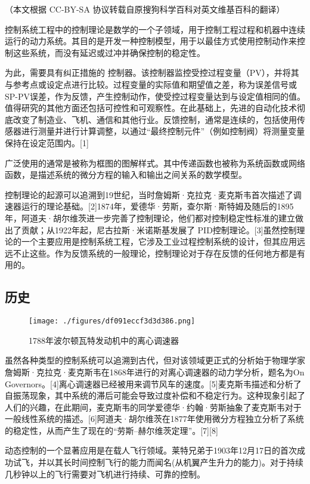 
（本文根据 CC-BY-SA 协议转载自原搜狗科学百科对英文维基百科的翻译）

控制系统工程中的控制理论是数学的一个子领域，用于控制工程过程和机器中连续运行的动力系统。其目的是开发一种控制模型，用于以最佳方式使用控制动作来控制这些系统，而没有延迟或过冲并确保控制的稳定性。

为此，需要具有纠正措施的 控制器。该控制器监控受控过程变量（PV），并将其与参考点或设定点进行比较。过程变量的实际值和期望值之差，称为误差信号或SP-PV误差，作为反馈，产生控制动作，使受控过程变量达到与设定值相同的值。值得研究的其他方面还包括可控性和可观察性。在此基础上，先进的自动化技术彻底改变了制造业、飞机、通信和其他行业。反馈控制，通常是连续的，包括使用传感器进行测量并进行计算调整，以通过“最终控制元件”（例如控制阀）将测量变量保持在设定范围内。[1]

广泛使用的通常是被称为框图的图解样式。其中传递函数也被称为系统函数或网络函数，是描述系统的微分方程的输入和输出之间关系的数学模型。

控制理论的起源可以追溯到19世纪，当时詹姆斯·克拉克·麦克斯韦首次描述了调速器运行的理论基础。[2]1874年，爱德华·劳斯，查尔斯·斯特姆及随后的1895年，阿道夫·胡尔维茨进一步完善了控制理论，他们都对控制稳定性标准的建立做出了贡献；从1922年起，尼古拉斯·米诺斯基发展了 PID控制理论。[3]虽然控制理论的一个主要应用是控制系统工程，它涉及工业过程控制系统的设计，但其应用远远不止这些。作为反馈系统的一般理论，控制理论对于存在反馈的任何地方都是有用的。

\subsection{历史}

\begin{figure}[ht]
\centering
\texttt{[image: ./figures/df091eccf3d3d386.png]}
\caption{1788年波尔顿瓦特发动机中的离心调速器} \label{fig_KZLL_5}
\end{figure}

虽然各种类型的控制系统可以追溯到古代，但对该领域更正式的分析始于物理学家詹姆斯·克拉克·麦克斯韦在1868年进行的对离心调速器的动力学分析，题名为On Governors。[4]离心调速器已经被用来调节风车的速度。[5]麦克斯韦描述和分析了自振荡现象，其中系统的滞后可能会导致过度补偿和不稳定行为。这种现象引起了人们的兴趣，在此期间，麦克斯韦的同学爱德华·约翰·劳斯抽象了麦克斯韦对于一般线性系统的描述。[6]阿道夫·胡尔维茨在1877年使用微分方程独立分析了系统的稳定性，从而产生了现在的“劳斯–赫尔维茨定理”。[7][8]

动态控制的一个显著应用是在载人飞行领域。莱特兄弟于1903年12月17日的首次成功试飞，并以其长时间控制飞行的能力而闻名(从机翼产生升力的能力)。对于持续几秒钟以上的飞行需要对飞机进行持续、可靠的控制。

